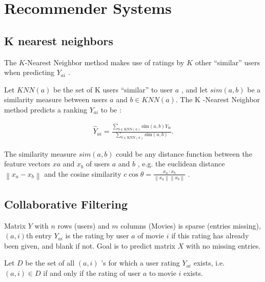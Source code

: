 \newcommand{\quotes}[1]{``#1''}
\section{Recommender Systems}

\subsection{K nearest neighbors}

The  $K$-Nearest Neighbor method makes use of ratings by  $K$  other \quotes{similar} users when predicting  $Y_{ai}$ .

Let  $KNN(a)$  be the set of  K  users \quotes{similar} to user  $a$ , and let $sim(a,b)$ be a similarity measure between users  $a$  and  $b \in KNN(a)$. The  K -Nearest Neighbor method predicts a ranking  $Y_{ai}$  to be :

\begin{align*}
\widehat{Y}_{ai} = \displaystyle \frac{\displaystyle \sum _{b \in \text {KNN}(a)} \text {sim}(a,b) Y_{bi}}{\displaystyle \sum _{b \in \text {KNN}(a)} \text {sim}(a,b)}.
\end{align*}

 
The similarity measure  $sim(a,b)$  could be any distance function between the feature vectors  $xa$ and  $x_b$  of users  $a$  and  $b$ , e.g. the euclidean distance  $\left\|  x_ a-x_ b \right\|$  and the cosine similarity  $c\displaystyle \cos \theta = \frac{x_ a\cdot x_ b}{\left\|  x_ a \right\| \left\|  x_ b \right\| }$ . 


\subsection{Collaborative Filtering}

Matrix $Y$ with $n$ rows (users) and $m$ columns (Movies) is sparse (entries missing), $(a,i)$th  entry  $Y_{ai}$  is the rating by user  $a$  of movie  $i$ if this rating has already been given, and blank if not. Goal is to predict matrix $X$ with no missing entries.

Let $D$  be the set of all $(a,i)$ 's for which a user rating  $Y_{ai}$  exists, i.e. $(a,i) \in D$ if and only if the rating of user  $a$  to movie  $i$  exists.


